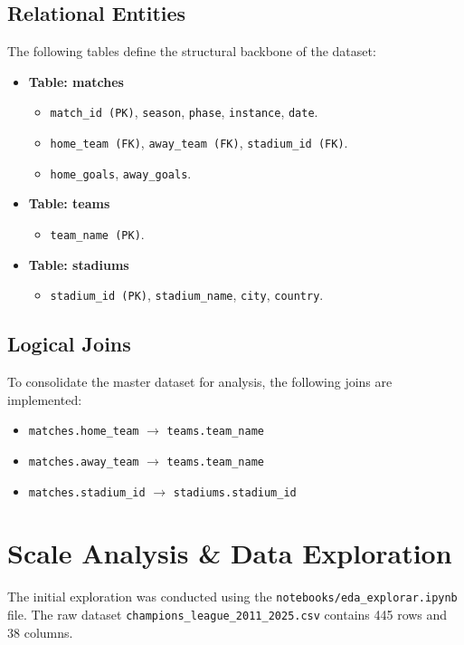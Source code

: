 \documentclass[12pt,a4paper]{article}
\begin{document}
\subsection{Relational Entities}
The following tables define the structural backbone of the dataset:
\begin{itemize}
    \item \textbf{Table: matches}
    \begin{itemize}
        \item \texttt{match\_id (PK)}, \texttt{season}, \texttt{phase}, \texttt{instance}, \texttt{date}.
        \item \texttt{home\_team (FK)}, \texttt{away\_team (FK)}, \texttt{stadium\_id (FK)}.
        \item \texttt{home\_goals}, \texttt{away\_goals}.
    \end{itemize}
    
    \item \textbf{Table: teams}
    \begin{itemize}
        \item \texttt{team\_name (PK)}.
    \end{itemize}

    \item \textbf{Table: stadiums}
    \begin{itemize}
        \item \texttt{stadium\_id (PK)}, \texttt{stadium\_name}, \texttt{city}, \texttt{country}.
    \end{itemize}
\end{itemize}

\subsection{Logical Joins}
To consolidate the master dataset for analysis, the following joins are implemented:
\begin{itemize}
    \item \texttt{matches.home\_team} $\rightarrow$ \texttt{teams.team\_name}
    \item \texttt{matches.away\_team} $\rightarrow$ \texttt{teams.team\_name}
    \item \texttt{matches.stadium\_id} $\rightarrow$ \texttt{stadiums.stadium\_id}
\end{itemize}

\section{Scale Analysis \& Data Exploration}
The initial exploration was conducted using the \texttt{notebooks/eda\_explorar.ipynb} file. The raw dataset \texttt{champions\_league\_2011\_2025.csv} contains 445 rows and 38 columns.
\end{document}
